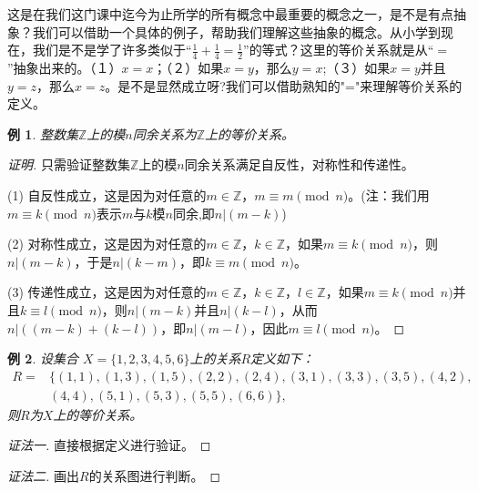 \documentclass{book}[oneside]
\newtheorem{Example}{例}[chapter]
\begin{document}
\begin{CJK*}{UTF8}{gbsn}
  这是在我们这门课中迄今为止所学的所有概念中最重要的概念之一，是不是有点抽象？我们可以借助一个具体的例子，帮助我们理解这些抽象的概念。从小学到现在，我们是不是学了许多类似于“$\frac{1}{4}+\frac{1}{4}=\frac{1}{2}$”的等式？这里的等价关系就是从“$=$”抽象出来的。（１）$x=x$；（２）如果$x=y$，那么$y=x$;（３）如果$x=y$并且$y=z$，那么$x=z$。是不是显然成立呀?我们可以借助熟知的"="来理解等价关系的定义。
  \begin{Example}\label{mod}
    整数集$\mathbb{Z}$上的模$n$同余关系为$\mathbb{Z}$上的等价关系。
  \end{Example}
  \begin{proof}[证明]
    只需验证整数集$\mathbb{Z}$上的模$n$同余关系满足自反性，对称性和传递性。

    (1) 自反性成立，这是因为对任意的$m\in \mathbb{Z}$，$m\equiv m \pmod{n}$。(注：我们用$m\equiv k \pmod{n}$表示$m$与$k$模$n$同余,即$n | (m-k)$)

    (2) 对称性成立，这是因为对任意的$m\in \mathbb{Z}$，$k\in \mathbb{Z}$，如果$m\equiv k \pmod{n}$，则$n | (m-k)$，于是$n | (k-m)$，即$k\equiv m \pmod{n}$。

    (3) 传递性成立，这是因为对任意的$m\in \mathbb{Z}$，$k\in \mathbb{Z}$，$l\in \mathbb{Z}$，如果$m\equiv k \pmod{n}$并且$k\equiv l \pmod{n}$，则$n | (m-k)$并且$n | (k-l)$，从而$n | ((m-k) + (k-l))$，即$n | (m-l)$，因此$m\equiv l \pmod{n}$。
  \end{proof}
  \begin{Example}\label{number}
    设集合
    $X=\{1,2,3,4,5,6 \}$上的关系$R$定义如下：
    \begin{align*}
      R=&\{(1,1),(1,3),(1,5),(2,2),(2,4),(3,1),(3,3),(3,5),(4,2),\\
      &(4,4),(5,1),(5,3),(5,5),(6,6)\},
    \end{align*}
      则$R$为$X$上的等价关系。
    \end{Example}
    \begin{proof}[证法一]
      直接根据定义进行验证。
    \end{proof}
    \begin{proof}[证法二]
      画出$R$的关系图进行判断。

      
\end{proof}
\end{CJK*}
\end{document}
